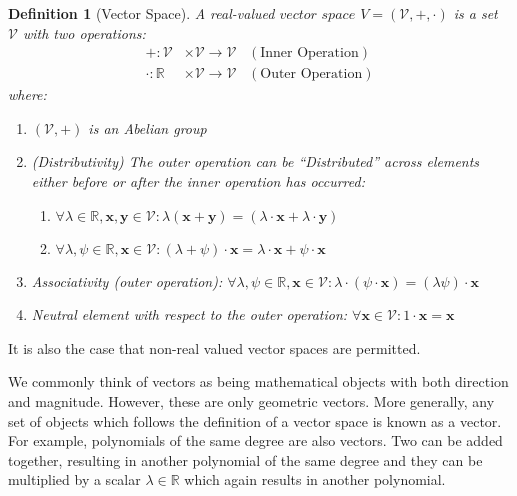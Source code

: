 \documentclass[a4paper,12pt]{book}
\newcommand{\set}[1]{\mathcal{#1}}
\newcommand{\vectr}[1]{\textbf{#1}}
\newcommand{\real}{\mathbb{R}}
\newcommand{\italic}[1]{\textit{#1}}
\newtheorem{definition}{Definition}[section]
\begin{document}
	\begin{definition}[Vector Space]
		\normalfont A real-valued $\italic{vector space}$ $V = (\set{V}, +, \cdot)$ is a set $\set{V}$ with two operations:
		\begin{align}
			+: \set{V} &\times \set{V} \rightarrow \set{V} \hspace{10pt} (\text{Inner Operation}) \\
			\cdot: \real &\times \set{V} \rightarrow \set{V} \hspace{10pt} (\text{Outer Operation})
		\end{align}
		where:
		\begin{enumerate}
			\item $(\set{V}, +)$ is an Abelian group
			\item (Distributivity) The outer operation can be ``Distributed'' across elements either before or after the inner operation has occurred: 
			\begin{enumerate}
				\item $\forall \lambda \in \real, \vectr{x}, \vectr{y} \in \mathcal{V}: \lambda (\vectr{x} + \vectr{y}) = (\lambda \cdot \vectr{x} + \lambda \cdot \vectr{y})$
				\item $\forall \lambda, \psi \in \real, \vectr{x} \in \set{V}: (\lambda + \psi) \cdot \vectr{x} = \lambda \cdot \vectr{x} + \psi \cdot \vectr{x}$
			\end{enumerate} 
			\item Associativity (outer operation): $\forall \lambda, \psi \in \real, \vectr{x} \in \set{V}: \lambda \cdot (\psi \cdot \vectr{x}) = (\lambda \psi) \cdot \vectr{x}$
			\item Neutral element with respect to the outer operation: $\forall \vectr{x} \in \set{V}: 1 \cdot \vectr{x} = \vectr{x}$
		\end{enumerate}
		\label{def:vector_space}
	\end{definition}
	It is also the case that non-real valued vector spaces are permitted. 
	
	We commonly think of vectors as being mathematical objects with both direction and magnitude. However, these are only geometric vectors. More generally, any set of objects which follows the definition of a vector space is known as a vector. For example, polynomials of the same degree are also vectors. Two can be added together, resulting in another polynomial of the same degree and they can be multiplied by a scalar $ \lambda \in \real $ which again results in another polynomial. 
	
\end{document}
